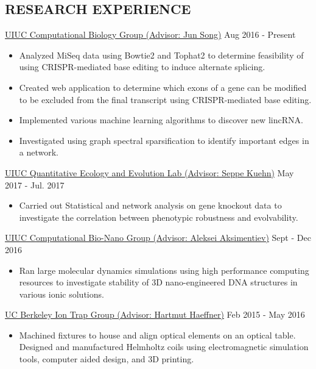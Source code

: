 \documentclass{res}
\begin{document}
\begin{resume}
\section{RESEARCH EXPERIENCE}
\vspace{2pt}
\href{http://song.igb.illinois.edu/}{UIUC Computational Biology Group (Advisor: Jun Song)}  \hfill Aug 2016 - Present
\begin{itemize}%
\item {\normalfont Analyzed MiSeq data using Bowtie2 and Tophat2 to determine feasibility of using CRISPR-mediated base editing to induce alternate splicing. }
\item {\normalfont Created web application to determine which exons of a gene can be modified to be excluded from the final transcript using CRISPR-mediated base editing.}
\item {\normalfont Implemented various machine learning algorithms to discover new lincRNA.}
\item {\normalfont Investigated using graph spectral sparsification to identify important edges in a network.}
\end{itemize}
\href{https://www.kuehnlab.org/}{UIUC Quantitative Ecology and Evolution Lab (Advisor: Seppe Kuehn)} \hfill May 2017 - Jul. 2017
\begin{itemize}
\item {\normalfont Carried out Statistical and network analysis on gene knockout data to investigate the correlation between phenotypic robustness and evolvability.}
\end{itemize}
\href{http://bionano.physics.illinois.edu/}{UIUC Computational Bio-Nano Group (Advisor: Aleksei Aksimentiev)} \hfill Sept - Dec 2016\\
\begin{itemize}
\item {\normalfont Ran large molecular dynamics simulations using high performance computing resources to investigate stability of 3D nano-engineered DNA structures in various ionic solutions.}
\end{itemize}
\href{http://research.physics.berkeley.edu/haeffner/}{UC Berkeley Ion Trap Group (Advisor: Hartmut Haeffner)} \hfill Feb 2015 - May 2016\\
\begin{itemize}
\item Machined fixtures to house and align optical elements on an optical table. Designed and manufactured Helmholtz coils using electromagnetic simulation tools, computer aided design, and 3D printing. %

\end{itemize}
\end{resume}
\end{document}
